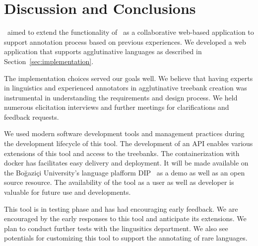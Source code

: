 \section{Discussion and Conclusions}
\label{sec:discussion}

\boatvtwo\ aimed to  extend the functionality of \boatvone\ as a collaborative web-based application to support annotation process based on previous experiences. 
We developed a web application that supports agglutinative languages as described in Section~\ref{sec:implementation}. 

The implementation choices served our goals well. 
We believe that having experts in linguistics and experienced annotators in agglutinative treebank creation was instrumental in understanding the requirements and design process. 
We held numerous elicitation interviews and further meetings for clarifications and feedback requests.

We used modern software development tools and management practices during the development lifecycle of this tool.
The development of an API enables various extensions of this tool and access to the treebanks.  
The containerization with docker has facilitates easy delivery and deployment.
It will be made available on the Boğaziçi University's language plafform DIP~\cite{DIP} as a demo as well as an open source resource.
The availability of the tool as a user as well as developer is valuable for future use and developments. 


This tool is in testing phase and has had encouraging early feedback.
We are encouraged by the early responses to this tool and anticipate its extensions.
We plan to conduct further tests with the lingusitics department. 
We also see potentials for customizing this tool to support the annotating of rare languages. 
